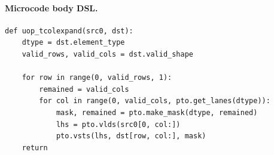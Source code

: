 \paragraph{Microcode body DSL.}
\begin{lstlisting}[style=ptocode]
def uop_tcolexpand(src0, dst):
    dtype = dst.element_type
    valid_rows, valid_cols = dst.valid_shape

    for row in range(0, valid_rows, 1):
        remained = valid_cols
        for col in range(0, valid_cols, pto.get_lanes(dtype)):
            mask, remained = pto.make_mask(dtype, remained)
            lhs = pto.vlds(src0[0, col:])
            pto.vsts(lhs, dst[row, col:], mask)
    return
\end{lstlisting}
\Needspace{0.34\textheight}
